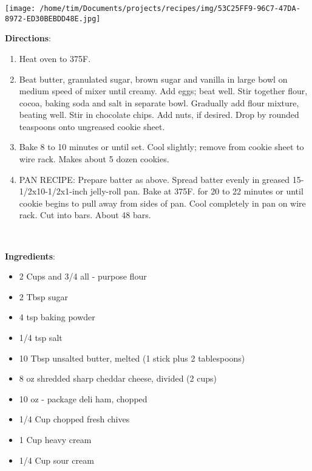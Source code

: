 \documentclass[11pt, twoside, openany]{book}
\begin{document}
\begin{minipage}[t]{0.2\linewidth}
\centering \strut\vspace*{-\baselineskip}\newline
\texttt{[image: /home/tim/Documents/projects/recipes/img/53C25FF9-96C7-47DA-8972-ED30BEBDD48E.jpg]}\\
\end{minipage}\vspace{3mm}
\textbf{Directions}:
\vspace{-3mm}\begin{enumerate}\setlength\itemsep{-1mm}
\item  Heat oven to 375F.
\item  Beat butter, granulated sugar, brown sugar and vanilla in large bowl on medium speed of mixer until creamy. Add eggs; beat well. Stir together flour, cocoa, baking soda and salt in separate bowl. Gradually add flour mixture, beating well. Stir in chocolate chips. Add nuts, if desired. Drop by rounded teaspoons onto ungreased cookie sheet.
\item Bake 8 to 10 minutes or until set. Cool slightly; remove from cookie sheet to wire rack. Makes about 5 dozen cookies.
\item PAN RECIPE: Prepare batter as above. Spread batter evenly in greased 15-1/2x10-1/2x1-inch jelly-roll pan. Bake at 375F. for 20 to 22 minutes or until cookie begins to pull away from sides of pan. Cool completely in pan on wire rack. Cut into bars. About 48 bars.
\end{enumerate}
 \label{ham-and-cheese-scones}\hfill\textit{}\\
\begin{minipage}[t]{0.8\linewidth}
\textbf{Ingredients}:\vspace{-3mm}
\begin{multicols}{2}
\begin{itemize}\setlength\itemsep{-1mm}
\item 2 Cups and 3/4 all - purpose flour
\item 2 Tbsp sugar
\item 4 tsp baking powder
\item 1/4 tsp salt
\item 10 Tbsp unsalted butter, melted (1 stick plus 2 tablespoons)
\item 8 oz shredded sharp cheddar cheese, divided (2 cups)
\item 10 oz - package deli ham, chopped
\item 1/4 Cup chopped fresh chives
\item 1 Cup heavy cream
\item 1/4 Cup sour cream
\end{itemize}
\end{multicols}
\end{minipage}
\end{document}
